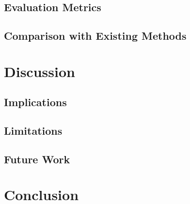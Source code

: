 \documentclass[10pt]{article}
\begin{document}
\subsection{Evaluation Metrics}
\subsection{Comparison with Existing Methods}

\section{Discussion}
\subsection{Implications}
\subsection{Limitations}
\subsection{Future Work}

\section{Conclusion}
\end{document}
